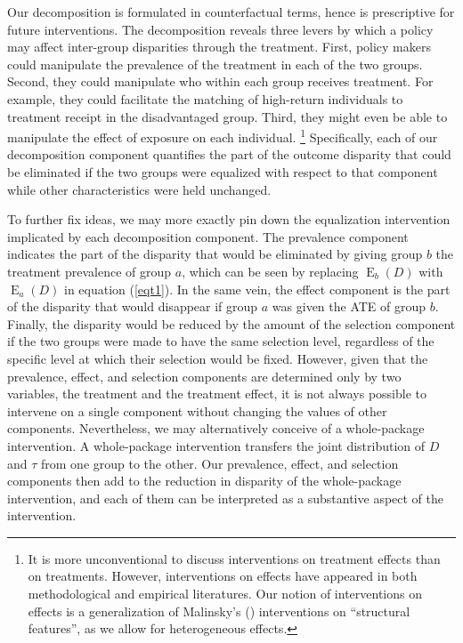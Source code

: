 \documentclass[12pt,a4paper]{article}
\newcommand{\E}{\operatorname{E}}
\begin{document}
Our decomposition is formulated in counterfactual terms, hence is prescriptive for future interventions. The decomposition reveals three levers by which a policy may affect inter-group disparities through the treatment. First, policy makers could manipulate the prevalence of the treatment in each of the two groups. Second, they could manipulate who within each group receives treatment. For example, they could facilitate the matching of high-return individuals to treatment receipt in the disadvantaged group. Third, they might even be able to manipulate the effect of exposure on each individual. \footnote{It is more unconventional to discuss interventions on treatment effects than on treatments. However, interventions on effects have appeared in both methodological \citep{malinsky_intervening_2018} and empirical \citep{brady_rethinking_2017} literatures.
Our notion of interventions on effects is a generalization of Malinsky's (\citeyear{malinsky_intervening_2018}) interventions on ``structural features'', as we allow for heterogeneous effects.} Specifically, each of our decomposition component quantifies the part of the outcome disparity that could be eliminated if the two groups were equalized with respect to that component while other characteristics were held unchanged.

To further fix ideas, we may more exactly pin down the equalization intervention implicated by each decomposition component. The prevalence component indicates the part of the disparity that would be eliminated by giving group $b$ the treatment prevalence of group $a$, which can be seen by replacing $\E_b(D)$ with $\E_a(D)$ in equation (\ref{eqt1}). In the same vein, the effect component is the part of the disparity that would disappear if group $a$ was given the ATE of group $b$. Finally, the disparity would be reduced by the amount of the selection component if the two groups were made to have the same selection level, regardless of the specific level at which their selection would be fixed. However, given that the prevalence, effect, and selection components are determined only by two variables, the treatment and the treatment effect, it is not always possible to intervene on a single component without changing the values of other components. Nevertheless, we may alternatively conceive of a whole-package intervention. A whole-package intervention transfers the joint distribution of $D$ and $\tau$ from one group to the other. Our prevalence, effect, and selection components then add to the reduction in disparity of the whole-package intervention, and each of them can be interpreted as a substantive aspect of the intervention.
\end{document}
